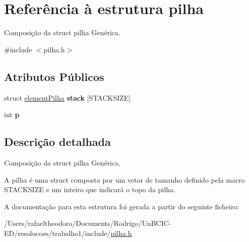 \hypertarget{structpilha}{}\section{Referência à estrutura pilha}
\label{structpilha}


Composição da struct pilha Genérica.  




{\ttfamily \#include $<$pilha.\+h$>$}

\subsection*{Atributos Públicos}
\begin{DoxyCompactItemize}
\item 
\mbox{\label{structpilha_af774dbeacb2a78ac8585105663089592}} 
struct \hyperlink{structelement_pilha}{element\+Pilha} {\bfseries stack} \mbox{[}S\+T\+A\+C\+K\+S\+I\+ZE\mbox{]}
\item 
\mbox{\label{structpilha_af5f884680e1122e92d87feca90b3c5f9}} 
int {\bfseries p}
\end{DoxyCompactItemize}


\subsection{Descrição detalhada}
Composição da struct pilha Genérica. 

A pilha é uma struct composta por um vetor de tamanho definido pela macro S\+T\+A\+C\+K\+S\+I\+ZE e um inteiro que indicará o topo da pilha. 

A documentação para esta estrutura foi gerada a partir do seguinte ficheiro\+:\begin{DoxyCompactItemize}
\item 
/\+Users/rafaeltheodoro/\+Documents/\+Rodrigo/\+Un\+B\+C\+I\+C-\/\+E\+D/resolucoes/trabalho1/include/\hyperlink{pilha_8h}{pilha.\+h}\end{DoxyCompactItemize}
